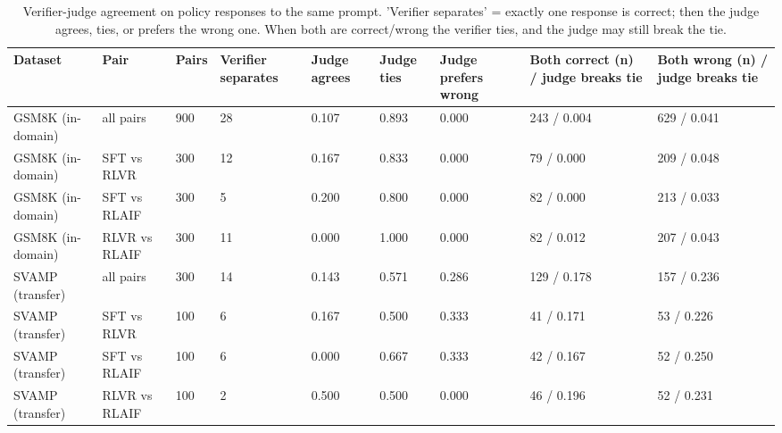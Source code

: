 \begin{table}[t]
\centering
\small
\caption{Verifier-judge agreement on policy responses to the same prompt. 'Verifier separates' = exactly one response is correct; then the judge agrees, ties, or prefers the wrong one. When both are correct/wrong the verifier ties, and the judge may still break the tie.}
\begin{tabular}{lllllllll}
\toprule
Dataset & Pair & Pairs & Verifier separates & Judge agrees & Judge ties & Judge prefers wrong & Both correct (n) / judge breaks tie & Both wrong (n) / judge breaks tie \\
\midrule
GSM8K (in-domain) & all pairs & 900 & 28 & 0.107 & 0.893 & 0.000 & 243 / 0.004 & 629 / 0.041 \\
GSM8K (in-domain) & SFT vs RLVR & 300 & 12 & 0.167 & 0.833 & 0.000 & 79 / 0.000 & 209 / 0.048 \\
GSM8K (in-domain) & SFT vs RLAIF & 300 & 5 & 0.200 & 0.800 & 0.000 & 82 / 0.000 & 213 / 0.033 \\
GSM8K (in-domain) & RLVR vs RLAIF & 300 & 11 & 0.000 & 1.000 & 0.000 & 82 / 0.012 & 207 / 0.043 \\
SVAMP (transfer) & all pairs & 300 & 14 & 0.143 & 0.571 & 0.286 & 129 / 0.178 & 157 / 0.236 \\
SVAMP (transfer) & SFT vs RLVR & 100 & 6 & 0.167 & 0.500 & 0.333 & 41 / 0.171 & 53 / 0.226 \\
SVAMP (transfer) & SFT vs RLAIF & 100 & 6 & 0.000 & 0.667 & 0.333 & 42 / 0.167 & 52 / 0.250 \\
SVAMP (transfer) & RLVR vs RLAIF & 100 & 2 & 0.500 & 0.500 & 0.000 & 46 / 0.196 & 52 / 0.231 \\
\bottomrule
\end{tabular}
\end{table}
